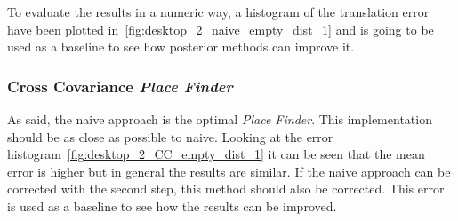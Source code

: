 To evaluate the results in a numeric way, a histogram of the translation error have been plotted in~\ref{fig:desktop_2_naive_empty_dist_1} and is going to be used as a baseline to see how posterior methods can improve it.\\

\subsubsection{Cross Covariance \textit{Place Finder}}
\label{ssub:cross_covariance_place_finder}

As said, the naive approach is the optimal \textit{Place Finder}. This implementation should be as close as possible to naive. Looking at the error histogram~\ref{fig:desktop_2_CC_empty_dist_1} it can be seen that the mean error is higher but in general the results are similar. If the naive approach can be corrected with the second step, this method should also be corrected. This error is used as a baseline to see how the results can be improved.\\

